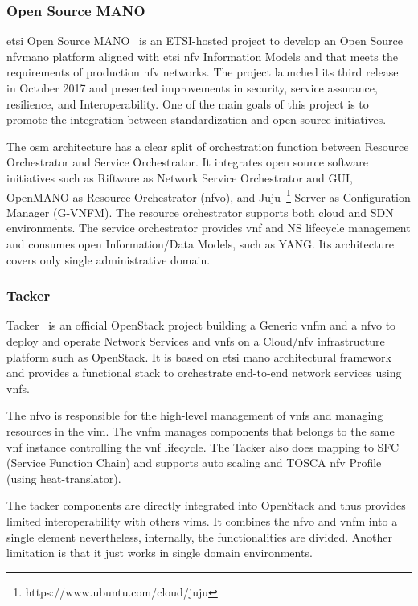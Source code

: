 \subsubsection{Open Source MANO}
\gls{etsi} Open Source MANO~\cite{ETSIOpenMANO} is an ETSI-hosted project to develop an Open Source \gls{nfvmano} platform aligned with \gls{etsi} \gls{nfv} Information Models and that meets the requirements of production \gls{nfv} networks. The project launched its third release~\cite{Israel2017OSMOverviewb} in October 2017 and presented improvements in security, service assurance, resilience, and Interoperability. One of the main goals of this project is to promote the integration between standardization and open source initiatives.

The \gls{osm} architecture has a clear split of orchestration function between Resource Orchestrator and Service Orchestrator. It integrates open source software initiatives such as Riftware as Network Service Orchestrator and GUI, OpenMANO as Resource Orchestrator (\gls{nfvo}), and Juju~\footnote{https://www.ubuntu.com/cloud/juju} Server as Configuration Manager (G-VNFM). The resource orchestrator supports both cloud and SDN environments. The service orchestrator provides \gls{vnf} and NS lifecycle management and consumes open Information/Data Models, such as YANG. Its architecture covers only single administrative domain.  

\subsubsection{Tacker}
Tacker~\cite{OpenStackFoundation2016} is an official OpenStack project building a Generic \gls{vnfm} and a \gls{nfvo} to deploy and operate Network Services and \glspl{vnf} on a Cloud/\gls{nfv} infrastructure platform such as OpenStack. It is based on \gls{etsi} \gls{mano} architectural framework and provides a functional stack to orchestrate end-to-end network services using \glspl{vnf}.

The \gls{nfvo} is responsible for the high-level management of \glspl{vnf} and managing resources in the \gls{vim}. The \gls{vnfm} manages components that belongs to the same \gls{vnf} instance controlling the \gls{vnf} lifecycle. The Tacker also does mapping to SFC (Service Function Chain) and supports auto scaling and TOSCA \gls{nfv} Profile (using heat-translator).

The tacker components are directly integrated into OpenStack and thus provides limited interoperability with others \glspl{vim}. It combines the \gls{nfvo} and \gls{vnfm} into a single element nevertheless, internally, the functionalities are divided. Another limitation is that it just works in single domain environments.   

